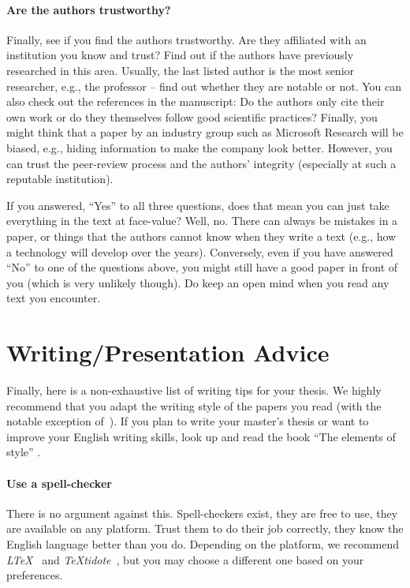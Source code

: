 \documentclass[a4paper]{article}
\begin{document}
\paragraph{Are the authors trustworthy?}
Finally, see if you find the authors trustworthy.
Are they affiliated with an institution you know and trust?
Find out if the authors have previously researched in this area.
Usually, the last listed author is the most senior researcher, e.g., the professor -- find out whether they are notable or not.
You can also check out the references in the manuscript:
Do the authors only cite their own work or do they themselves follow good scientific practices?
Finally, you might think that a paper by an industry group such as Microsoft Research will be biased, e.g., hiding information to make the company look better.
However, you can trust the peer-review process and the authors' integrity (especially at such a reputable institution).

If you answered, ``Yes'' to all three questions, does that mean you can just take everything in the text at face-value?
Well, no.
There can always be mistakes in a paper, or things that the authors cannot know when they write a text (e.g., how a technology will develop over the years).
Conversely, even if you have answered ``No'' to one of the questions above, you might still have a good paper in front of you (which is very unlikely though).
Do keep an open mind when you read any text you encounter.

\section{Writing/Presentation Advice}
\label{sec:writing}

Finally, here is a non-exhaustive list of writing tips for your thesis.
We highly recommend that you adapt the writing style of the papers you read (with the notable exception of~\cite{lamport1998part}).
If you plan to write your master's thesis or want to improve your English writing skills, look up and read the book ``The elements of style'' \cite{strunkelements}.


\paragraph{Use a spell-checker}
There is no argument against this.
Spell-checkers exist, they are free to use, they are available on any platform.
Trust them to do their job correctly, they know the English language better than you do.
Depending on the platform, we recommend \emph{LTeX}~\cite{ltex} and \emph{TeXtidote}~\cite{textidote}, but you may choose a different one based on your preferences.
\end{document}
